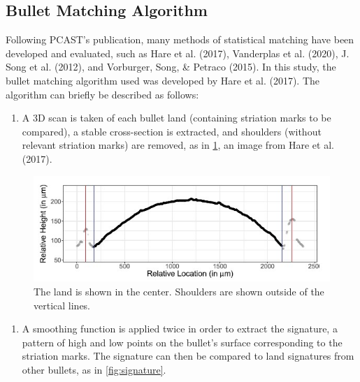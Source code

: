 \documentclass[print]{nuthesis}
\providecommand{\tightlist}{%
  \setlength{\itemsep}{0pt}\setlength{\parskip}{0pt}}
\begin{document}
\hypertarget{bullet-matching-algorithm-1}{%
\subsection{Bullet Matching Algorithm}\label{bullet-matching-algorithm-1}}

Following PCAST's publication, many methods of statistical matching have been developed and evaluated, such as Hare et al. (2017), Vanderplas et al. (2020), J. Song et al. (2012), and Vorburger, Song, \& Petraco (2015).
In this study, the bullet matching algorithm used was developed by Hare et al. (2017).
The algorithm can briefly be described as follows:

\begin{enumerate}
\def\labelenumi{\arabic{enumi}.}
\tightlist
\item
  A 3D scan is taken of each bullet land (containing striation marks to be compared), a stable cross-section is extracted, and shoulders (without relevant striation marks) are removed, as in \ref{fig:shoulder}, an image from Hare et al. (2017).
\end{enumerate}

\begin{figure}
\includegraphics[width=\linewidth]{images/shoulder} \caption{The land is shown in the center. Shoulders are shown outside of the vertical lines.}\label{fig:shoulder}
\end{figure}

\begin{enumerate}
\def\labelenumi{\arabic{enumi}.}
\setcounter{enumi}{1}
\tightlist
\item
  A smoothing function is applied twice in order to extract the signature, a pattern of high and low points on the bullet's surface corresponding to the striation marks.
  The signature can then be compared to land signatures from other bullets, as in \ref{fig:signature}.
\end{enumerate}
\end{document}
